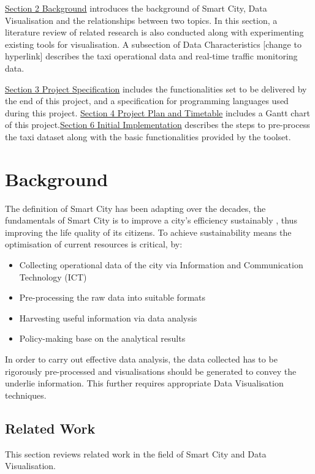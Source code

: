 \documentclass[doc,natbib]{apa6}
\begin{document}
\hyperref[sec2]{Section 2 Background} introduces the background of Smart City, Data Visualisation and the relationships between two topics. In this section, a literature review of related research is also conducted along with experimenting existing tools for visualisation. A subsection of Data Characteristics [change to hyperlink] describes the taxi operational data and real-time traffic monitoring data.

\hyperref[sec3]{Section 3 Project Specification} includes the functionalities set to be delivered by the end of this project, and a specification for programming languages used during this project. \hyperref[sec4]{Section 4 Project Plan and Timetable} includes a Gantt chart of this project.\hyperref[sec5]{Section 6 Initial Implementation} describes the steps to pre-process the taxi dataset along with the basic functionalities provided by the toolset.

\section{Background}
\label{sec2}
The definition of Smart City has been adapting over the decades, the fundamentals of Smart City is to improve a city's efficiency sustainably \citep{Caragliu2011}, thus improving the life quality of its citizens. To achieve sustainability means the optimisation of current resources is critical, by:
\begin{itemize}
	\item Collecting operational data of the city via Information and Communication Technology (ICT) \citep{Deakin2011}
	\item Pre-processing the raw data into suitable formats
	\item Harvesting useful information via data analysis
	\item Policy-making base on the analytical results \citep{Lazaroiu2012}
\end{itemize}
In order to carry out effective data analysis, the data collected has to be rigorously pre-processed and visualisations should be generated to convey the underlie information. This further requires appropriate Data Visualisation techniques.

\subsection{Related Work}
This section reviews related work in the field of Smart City and Data Visualisation.\hfil\newline
\end{document}
